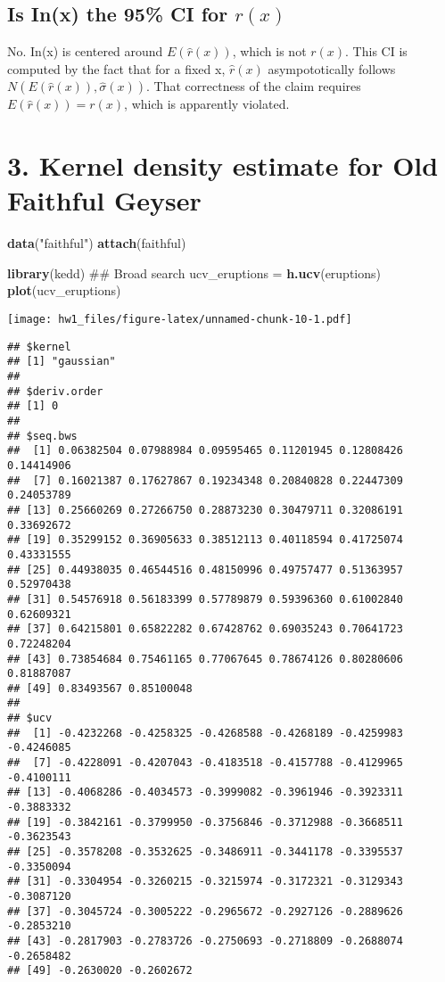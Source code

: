 \documentclass[]{article}
\newenvironment{Shaded}{\begin{snugshade}}{\end{snugshade}}
\newcommand{\KeywordTok}[1]{\textcolor[rgb]{0.13,0.29,0.53}{\textbf{#1}}}
\newcommand{\StringTok}[1]{\textcolor[rgb]{0.31,0.60,0.02}{#1}}
\newcommand{\NormalTok}[1]{#1}
\begin{document}
\subsection{\texorpdfstring{Is In(x) the 95\% CI for
\(r(x)\)}{Is In(x) the 95\% CI for r(x)}}\label{is-inx-the-95-ci-for-rx}

No. In(x) is centered around \(E(\hat{r}(x))\), which is not \(r(x)\).
This CI is computed by the fact that for a fixed x, \(\hat{r}(x)\)
asympototically follows \(N(E(\hat{r}(x)), \hat{\sigma}(x))\). That
correctness of the claim requires \(E(\hat{r}(x)) = r(x)\), which is
apparently violated.

\section{3. Kernel density estimate for Old Faithful
Geyser}\label{kernel-density-estimate-for-old-faithful-geyser}

\begin{Shaded}
\begin{Highlighting}[]
\KeywordTok{data}\NormalTok{(}\StringTok{"faithful"}\NormalTok{)}
\KeywordTok{attach}\NormalTok{(faithful)}

\KeywordTok{library}\NormalTok{(kedd)}
\NormalTok{## Broad search}
\NormalTok{ucv_eruptions =}\StringTok{ }\KeywordTok{h.ucv}\NormalTok{(eruptions)}
\KeywordTok{plot}\NormalTok{(ucv_eruptions)}
\end{Highlighting}
\end{Shaded}

\texttt{[image: hw1\_files/figure-latex/unnamed-chunk-10-1.pdf]}

\begin{verbatim}
## $kernel
## [1] "gaussian"
## 
## $deriv.order
## [1] 0
## 
## $seq.bws
##  [1] 0.06382504 0.07988984 0.09595465 0.11201945 0.12808426 0.14414906
##  [7] 0.16021387 0.17627867 0.19234348 0.20840828 0.22447309 0.24053789
## [13] 0.25660269 0.27266750 0.28873230 0.30479711 0.32086191 0.33692672
## [19] 0.35299152 0.36905633 0.38512113 0.40118594 0.41725074 0.43331555
## [25] 0.44938035 0.46544516 0.48150996 0.49757477 0.51363957 0.52970438
## [31] 0.54576918 0.56183399 0.57789879 0.59396360 0.61002840 0.62609321
## [37] 0.64215801 0.65822282 0.67428762 0.69035243 0.70641723 0.72248204
## [43] 0.73854684 0.75461165 0.77067645 0.78674126 0.80280606 0.81887087
## [49] 0.83493567 0.85100048
## 
## $ucv
##  [1] -0.4232268 -0.4258325 -0.4268588 -0.4268189 -0.4259983 -0.4246085
##  [7] -0.4228091 -0.4207043 -0.4183518 -0.4157788 -0.4129965 -0.4100111
## [13] -0.4068286 -0.4034573 -0.3999082 -0.3961946 -0.3923311 -0.3883332
## [19] -0.3842161 -0.3799950 -0.3756846 -0.3712988 -0.3668511 -0.3623543
## [25] -0.3578208 -0.3532625 -0.3486911 -0.3441178 -0.3395537 -0.3350094
## [31] -0.3304954 -0.3260215 -0.3215974 -0.3172321 -0.3129343 -0.3087120
## [37] -0.3045724 -0.3005222 -0.2965672 -0.2927126 -0.2889626 -0.2853210
## [43] -0.2817903 -0.2783726 -0.2750693 -0.2718809 -0.2688074 -0.2658482
## [49] -0.2630020 -0.2602672
\end{verbatim}
\end{document}
